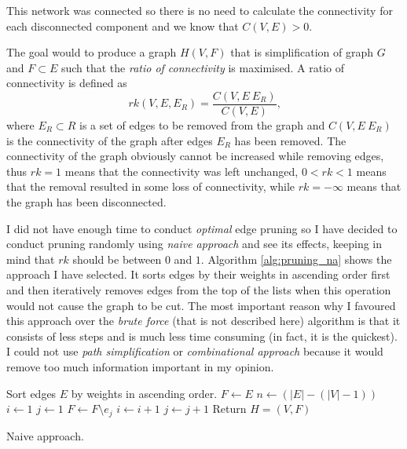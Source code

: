     This network was connected so there is no need to calculate the connectivity for each disconnected component and we know that $C(V, E) > 0$.
    
    The goal would to produce a graph $H(V, F)$ that is simplification of graph $G$ and $F \subset E$ such that the \emph{ratio of connectivity} is maximised. A ratio of connectivity is defined as
    \begin{equation}
     rk (V, E, E_R) = \frac{C(V, E \ E_R)}{C(V, E)} \mbox{,}
    \end{equation}
    where $E_R \subset R$ is a set of edges to be removed from the graph and $C(V, E \ E_R)$ is the connectivity of the graph after edges $E_R$ has been removed. The connectivity of the graph obviously cannot be increased while removing edges, thus $rk = 1$ means that the connectivity was left unchanged, $0 < rk < 1$ means that the removal resulted in some loss of connectivity, while $rk = -\infty$ means that the graph has been disconnected.
    
    I did not have enough time to conduct \emph{optimal} edge pruning so I have decided to conduct pruning randomly using \emph{naive approach} and see its effects, keeping in mind that $rk$ should be between $0$ and $1$. Algorithm \ref{alg:pruning_na} shows the approach I have selected. It sorts edges by their weights in ascending order first and then iteratively removes edges from the top of the lists when this operation would not cause the graph to be cut. The most important reason why I favoured this approach over the \emph{brute force} (that is not described here) algorithm is that it consists of less steps and is much less time consuming (in fact, it is the quickest)\cite{ZhouMahlerToivonen2012}. I could not use \emph{path simplification} or \emph{combinational approach} because it would remove too much information important in my opinion.
    \begin{algorithm}[H]
      \begin{algorithmic}[1]
          \State Sort edges $E$ by weights in ascending order.
          \State $F \gets E$
          \State $n \gets (|E| - (|V| - 1))$
          \State $i \gets 1$
          \State $j \gets 1$
              \State $F \gets F \setminus {e_j}$
              \State $i \gets i + 1$
            \EndIf
            \State $j \gets j + 1$
          \EndWhile
          \State Return $H = (V, F)$
        \EndProcedure
      \end{algorithmic}
      \caption{Naive approach.}
      \label{alg:pruning_na}
    \end{algorithm}
    
